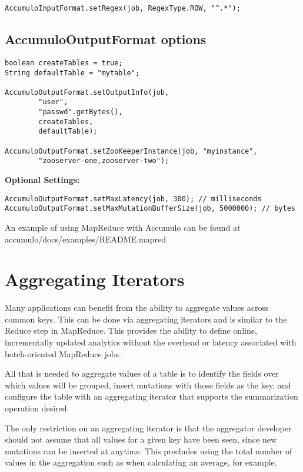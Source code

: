 \small
\begin{verbatim}
AccumuloInputFormat.setRegex(job, RegexType.ROW, "^.*");
\end{verbatim}
\normalsize

\subsection{AccumuloOutputFormat options}

\small
\begin{verbatim}
boolean createTables = true;
String defaultTable = "mytable";

AccumuloOutputFormat.setOutputInfo(job,
        "user",
        "passwd".getBytes(),
        createTables,
        defaultTable);

AccumuloOutputFormat.setZooKeeperInstance(job, "myinstance",
        "zooserver-one,zooserver-two");
\end{verbatim}

\Large
\textbf{Optional Settings:}
\normalsize

\small
\begin{verbatim}
AccumuloOutputFormat.setMaxLatency(job, 300); // milliseconds
AccumuloOutputFormat.setMaxMutationBufferSize(job, 5000000); // bytes
\end{verbatim}
\normalsize

An example of using MapReduce with Accumulo can be found at\\
accumulo/docs/examples/README.mapred

\section{Aggregating Iterators}

Many applications can benefit from the ability to aggregate values across common
keys. This can be done via aggregating iterators and is similar to the Reduce step in
MapReduce. This provides the ability to define online, incrementally updated
analytics without the overhead or latency associated with batch-oriented
MapReduce jobs.

All that is needed to aggregate values of a table is to identify the fields over which
values will be grouped, insert mutations with those fields as the key, and configure
the table with an aggregating iterator that supports the summarization operation
desired.

The only restriction on an aggregating iterator is that the aggregator developer
should not assume that all values for a given key have been seen, since new
mutations can be inserted at anytime. This precludes using the total number of
values in the aggregation such as when calculating an average, for example.

